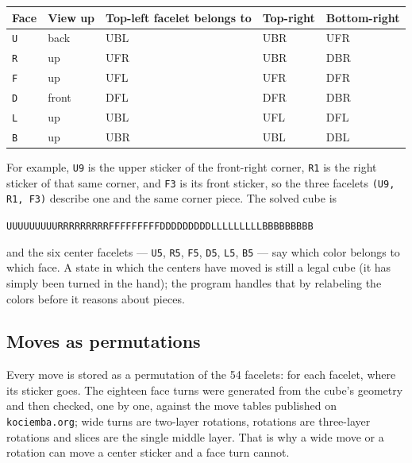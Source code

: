 \begin{center}
\begin{tabular}{@{}lllll@{}}
\toprule
Face & View up & Top-left facelet belongs to & Top-right & Bottom-right \\
\midrule
\texttt{U} & back          & UBL & UBR & UFR \\
\texttt{R} & up            & UFR & UBR & DBR \\
\texttt{F} & up            & UFL & UFR & DFR \\
\texttt{D} & front         & DFL & DFR & DBR \\
\texttt{L} & up            & UBL & UFL & DFL \\
\texttt{B} & up            & UBR & UBL & DBL \\
\bottomrule
\end{tabular}
\end{center}

For example, \texttt{U9} is the upper sticker of the front-right corner,
\texttt{R1} is the right sticker of that same corner, and \texttt{F3} is its front
sticker, so the three facelets \texttt{(U9, R1, F3)} describe one and the same
corner piece.  The solved cube is

\begin{center}
\texttt{UUUUUUUUURRRRRRRRRFFFFFFFFFDDDDDDDDDLLLLLLLLLBBBBBBBBB}
\end{center}

and the six center facelets --- \texttt{U5}, \texttt{R5}, \texttt{F5}, \texttt{D5},
\texttt{L5}, \texttt{B5} --- say which color belongs to which face.  A state in
which the centers have moved is still a legal cube (it has simply been turned in
the hand); the program handles that by relabeling the colors before it reasons
about pieces.

\subsection{Moves as permutations}

Every move is stored as a permutation of the 54 facelets: for each facelet, where
its sticker goes.  The eighteen face turns were generated from the cube's geometry
and then checked, one by one, against the move tables published on
\texttt{kociemba.org}; wide turns are two-layer rotations, rotations are three-layer
rotations and slices are the single middle layer.  That is why a wide move or a
rotation can move a center sticker and a face turn cannot.
